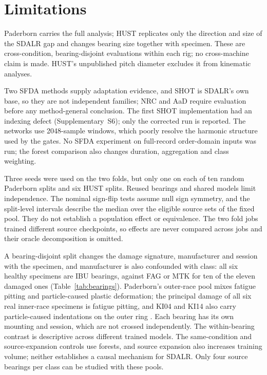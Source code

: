 \section{Limitations}
\label{sec:limitations}
Paderborn carries the full analysis; HUST replicates only the direction and size of the SDALR gap and changes bearing size together with specimen. These are cross-condition, bearing-disjoint evaluations within each rig; no cross-machine claim is made. HUST's unpublished pitch diameter excludes it from kinematic analyses.

Two SFDA methods supply adaptation evidence, and SHOT \cite{liang2020shot} is SDALR's own base, so they are not independent families; NRC \cite{yang2021nrc} and AaD \cite{yang2022aad} require evaluation before any method-general conclusion. The first SHOT implementation had an indexing defect (Supplementary~S6); only the corrected run is reported. The networks use 2048-sample windows, which poorly resolve the harmonic structure used by the gates. No SFDA experiment on full-record order-domain inputs was run; the forest comparison also changes duration, aggregation and class weighting.

Three seeds were used on the two folds, but only one on each of ten random Paderborn splits and six HUST splits. Reused bearings and shared models limit independence. The nominal sign-flip tests assume null sign symmetry, and the split-level intervals describe the median over the eligible source sets of the fixed pool. They do not establish a population effect or equivalence. The two fold jobs trained different source checkpoints, so effects are never compared across jobs and their oracle decomposition is omitted.

A bearing-disjoint split changes the damage signature, manufacturer and session with the specimen, and manufacturer is also confounded with class: all six healthy specimens are IBU bearings, against FAG or MTK for ten of the eleven damaged ones (Table~\ref{tab:bearings}). Paderborn's outer-race pool mixes fatigue pitting and particle-caused plastic deformation; the principal damage of all six real inner-race specimens is fatigue pitting, and KI04 and KI14 also carry particle-caused indentations on the outer ring \cite{lessmeier2016,iso15243}. Each bearing has its own mounting and session, which are not crossed independently. The within-bearing contrast is descriptive across different trained models. The same-condition and source-expansion controls use forests, and source expansion also increases training volume; neither establishes a causal mechanism for SDALR. Only four source bearings per class can be studied with these pools.

